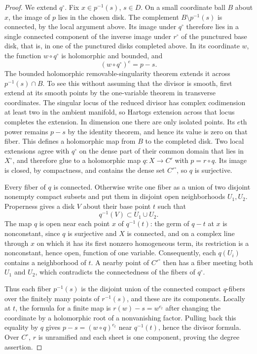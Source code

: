 \begin{proof}
We extend $q^\circ$. Fix $x\in p^{-1}(s)$, $s\in D$. On a
small coordinate ball $B$ about $x$, the image of $p$ lies in
the chosen disk. The complement $B\setminus p^{-1}(s)$ is
connected, by the local argument above. Its image under
$q^\circ$ therefore lies in a single connected component of the
inverse image under $r^\circ$ of the punctured base disk, that
is, in one of the punctured disks completed above. In its
coordinate $w$, the function $w\circ q^\circ$ is
holomorphic and bounded, and
\[
 (w\circ q^\circ)^e=p-s.
\]
The bounded holomorphic removable-singularity theorem extends
it across $p^{-1}(s)\cap B$. To see this without assuming that
the divisor is smooth, first extend at its smooth points by
the one-variable theorem in transverse coordinates. The
singular locus of the reduced divisor has complex codimension
at least two in the ambient manifold, so Hartogs extension
across that locus completes the extension. In dimension one
there are only isolated points. Its $e$th power remains $p-s$ by
the identity theorem, and hence its value is zero on that
fiber. This defines a holomorphic map from $B$ to the completed
disk. Two local extensions agree with $q^\circ$ on the dense
part of their common domain that lies in $X^\circ$, and therefore
glue to a holomorphic map $q\colon X\to C'$ with
$p=r\circ q$. Its image is closed, by compactness, and contains
the dense set $C'^\circ$, so $q$ is surjective.

Every fiber of $q$ is connected. Otherwise write one fiber
as a union of two disjoint nonempty compact subsets and put
them in disjoint open neighborhoods $U_1,U_2$. Properness
gives a disk $V$ about their base point $t$ such that
\[
 q^{-1}(V)\subset U_1\cup U_2.
\]
The map $q$ is open near each point $x$ of $q^{-1}(t)$: the
germ of $q-t$ at $x$ is nonconstant, since $q$ is surjective
and $X$ is connected, and on a complex line through $x$ on
which it has its first nonzero homogeneous term, its
restriction is a nonconstant, hence open, function of one
variable. Consequently, each $q(U_i)$ contains a neighborhood
of $t$. A nearby point of $C'^\circ$ then has a fiber meeting
both $U_1$ and $U_2$, which contradicts the connectedness of
the fibers of $q^\circ$.

Thus each fiber $p^{-1}(s)$ is the disjoint union of the
connected compact $q$-fibers over the finitely many points of
$r^{-1}(s)$, and these are its components. Locally at $t$, the formula for a
finite map is $r(w)-s=w^{e_t}$ after changing the coordinate
by a holomorphic root of a nonvanishing factor. Pulling back
this equality by $q$ gives $p-s=(w\circ q)^{e_t}$ near
$q^{-1}(t)$, hence the divisor formula. Over $C^\circ$, $r$ is
unramified and each sheet is one component, proving the
degree assertion.


\end{proof}

